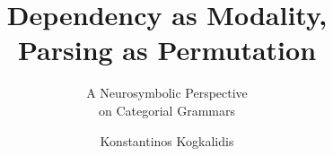 \documentclass[utrecht]{lotdiss}
\title{Dependency as Modality, \\Parsing as Permutation}
\subtitle{A Neurosymbolic Perspective\\
on Categorial Grammars}
\author{Konstantinos Kogkalidis}
\begin{document}
\FrontMatter






\MainMatter







\appendix


\BackMatter


\end{document}
